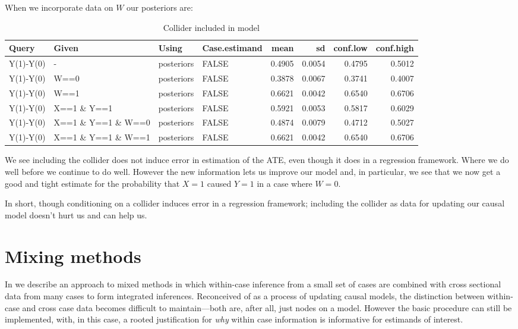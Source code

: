 \documentclass[
  12pt,
]{book}
\begin{document}
When we incorporate data on \(W\) our posteriors are:

\begin{table}

\caption{\label{tab:applearncoll8}Collider included in model}
\centering
\begin{tabular}[t]{l|l|l|l|r|r|r|r}
\hline
Query & Given & Using & Case.estimand & mean & sd & conf.low & conf.high\\
\hline
Y(1)-Y(0) & - & posteriors & FALSE & 0.4905 & 0.0054 & 0.4795 & 0.5012\\
\hline
Y(1)-Y(0) & W==0 & posteriors & FALSE & 0.3878 & 0.0067 & 0.3741 & 0.4007\\
\hline
Y(1)-Y(0) & W==1 & posteriors & FALSE & 0.6621 & 0.0042 & 0.6540 & 0.6706\\
\hline
Y(1)-Y(0) & X==1 \& Y==1 & posteriors & FALSE & 0.5921 & 0.0053 & 0.5817 & 0.6029\\
\hline
Y(1)-Y(0) & X==1 \& Y==1 \& W==0 & posteriors & FALSE & 0.4874 & 0.0079 & 0.4712 & 0.5027\\
\hline
Y(1)-Y(0) & X==1 \& Y==1 \& W==1 & posteriors & FALSE & 0.6621 & 0.0042 & 0.6540 & 0.6706\\
\hline
\end{tabular}
\end{table}

We see including the collider does not induce error in estimation of the ATE, even though it does in a regression framework. Where we do well before we continue to do well. However the new information lets us improve our model and, in particular, we see that we now get a good and tight estimate for the probability that \(X=1\) caused \(Y=1\) in a case where \(W=0\).

In short, though conditioning on a collider induces error in a regression framework; including the collider as data for updating our causal model doesn't hurt us and can help us.

\hypertarget{mixing-methods}{%
\chapter{Mixing methods}\label{mixing-methods}}

In \citet{humphreys2015mixing} we describe an approach to mixed methods in which within-case inference from a small set of cases are combined with cross sectional data from many cases to form integrated inferences. Reconceived of as a process of updating causal models, the distinction between within-case and cross case data becomes difficult to maintain---both are, after all, just nodes on a model. However the basic procedure can still be implemented, with, in this case, a rooted justification for \emph{why} within case information is informative for estimands of interest.
\end{document}
